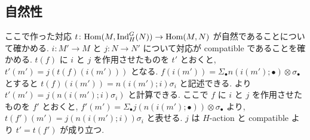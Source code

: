\documentclass{jsarticle}
\theoremstyle{break}
\newcommand{\ind}[3]{%
  \mathrm{Ind}^{#1}_{#2}({#3})
}
\newcommand{\homc}[2]{%
  \mathrm{Hom}({#1}, {#2})
}
\begin{document}
\subsection{自然性}
ここで作った対応 $t \colon \homc{M}{\ind{G}{H}{N}} \to \homc{M}{N}$ が自然であることについて確かめる. $i \colon M' \to M$ と $j \colon N \to N'$ について対応が compatible であることを確かめる. $t(f)$ に $i$ と $j$ を作用させたものを $t'$ とおくと, $t'(m') = j(t(f)(i(m')))$ となる. $f(i(m')) = \Sigma_\bullet n(i(m'); \bullet) \otimes \sigma_\bullet$ とすると $t(f)(i(m')) = n(i(m'); i) \sigma_i$ と記述できる. より $t'(m') = j(n(i(m'); i) \sigma_i)$ と計算できる. ここで $f$ に $i$ と $j$ を作用させたものを $f'$ とおくと, $f'(m') = \Sigma_\bullet j(n(i(m'); \bullet)) \otimes \sigma_\bullet$ より, $t(f')(m') = j(n(i(m'); i)) \sigma_i$ と表せる. $j$ は $H$-action と compatible より $t' = t(f')$ が成り立つ.
\end{document}
